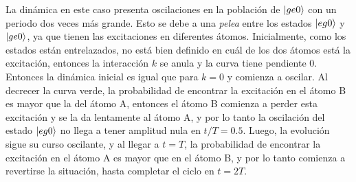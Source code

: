 La dinámica en este caso presenta oscilaciones en la población de $\ket{ge0}$ con un periodo dos veces más grande. Esto se debe a una \textit{pelea} entre los estados $\ket{eg0}$ y $\ket{ge0}$, ya que tienen las excitaciones en diferentes átomos. Inicialmente, como los estados están entrelazados, no está bien definido en cuál de los dos átomos está la excitación, entonces la interacción $k$ se anula y la curva tiene pendiente 0. Entonces la dinámica inicial es igual que para $k=0$ y comienza a oscilar. Al decrecer la curva verde, la probabilidad de encontrar la excitación en el átomo B es mayor que la del átomo A, entonces el átomo B comienza a perder esta excitación y se la da lentamente al átomo A, y por lo tanto la oscilación del estado $\ket{eg0}$ no llega a tener amplitud nula en $t/T=0.5$. Luego, la evolución sigue su curso oscilante, y al llegar a $t=T$, la probabilidad de encontrar la excitación en el átomo A es mayor que en el átomo B, y por lo tanto comienza a revertirse la situación, hasta completar el ciclo en $t=2T$. 

